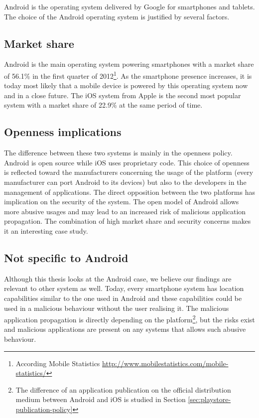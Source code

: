 Android is the operating system delivered by Google for smartphones and tablets.
The choice of the Android operating system is justified by several factors.\\

\subsection*{Market share}

Android is the main operating system powering smartphones with a market share of 56.1\% in the first quarter of 2012\footnote{According Mobile Statistics \url{http://www.mobilestatistics.com/mobile-statistics/}}.
As the smartphone presence increases, it is today most likely that a mobile device is powered by this operating system now and in a close future.
The iOS system from Apple is the second most popular system with a market share of 22.9\% at the same period of time.\\

\subsection*{Openness implications}
The difference between these two systems is mainly in the openness policy.
Android is open source while iOS uses proprietary code.
This choice of openness is reflected toward the manufacturers concerning the usage of the platform (every manufacturer can port Android to its devices) but also to the developers in the management of applications.
The direct opposition between the two platforms has implication on the security of the system.
The open model of Android allows more abusive usages and may lead to an increased risk of malicious application propagation.
The combination of high market share and security concerns makes it an interesting case study.\\

\subsection*{Not specific to Android}
Although this thesis looks at the Android case, we believe our findings are relevant to other system as well.
Today, every smartphone system has location capabilities similar to the one used in Android and these capabilities could be used in a malicious behaviour without the user realising it.
The malicious application propagation is directly depending on the platform\footnote{The difference of an application publication on the official distribution medium between Android and iOS is studied in Section \ref{sec:playstore-publication-policy}}, but the risks exist and malicious applications are present on any systems that allows such abusive behaviour.

